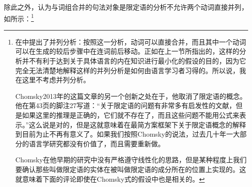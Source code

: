 除此之外，认为与词组合并的句法对象是限定语的分析不允许两个动词直接并列，如所示：\footnote{\label{fn-Chomsky-on-Specifiers}%
 \citet[]{Chomsky2013a}在中提出了并列分析：按照这一分析，动词可以直接合并，而且其中一个动词可以在生成的较后步骤中在连词前后移动。正如在上一节所指出的，这样的分析并不有利于达到关于具体语言的内在知识进行最小化的假设的目的，因为它完全无法清楚地解释这样的并列分析是如何由语言学习者习得的。所以说，我在这里不考虑并列分析。

Chomsky2013年的这篇文章的另一个创新之处在于，他取消了限定语的概念。他在第43页的脚注27写道：“关于限定语的问题有非常多有启发性的文献，但是如果这里的推理是正确的，它们就不存在了，而且这些问题不能用公式来表示。”这么说是对的，但是这就意味着在最简方案框架下关于限定语概念的解释到目前为止不再有意义了。如果我们按照Chomsky的说法，过去几十年一大部分的语言学研究都没有价值了，而且需要重新做。

Chomsky在他早期的研究中没有严格遵守线性化的思路，但是某种程度上我们要确认那些叫做限定语的实体在被叫做限定语的成分所在的位置上实现的。这就意味着下面的评论即使在Chomsky式的假设中也是相关的。
}


